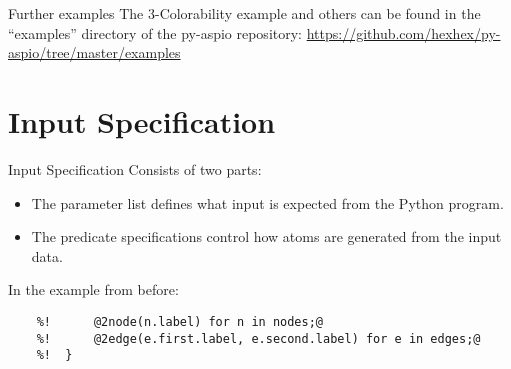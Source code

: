 \documentclass[%
beamer,%
english,%
10pt,%
]{beamer}
\newcommand{\blue}[1]{{\color{blue}#1}}
\newcommand{\orange}[1]{{\color{orange}#1}}
\begin{document}
\begin{frame}{Further examples}
    The 3-Colorability example and others can be found in the ``examples'' directory of the py-aspio repository:
    \url{https://github.com/hexhex/py-aspio/tree/master/examples}
\end{frame}



\section{Input Specification}

\begin{frame}[fragile]{Input Specification}
    Consists of two parts:
    \begin{itemize}
        \item
            The \blue{parameter list} defines what input is expected from the Python program.
        \item
            The \orange{predicate specifications} control how atoms are generated from the input data.
    \end{itemize}

    \bigskip

    In the example from before:
    \begin{lstlisting}[escapechar=`,basicstyle=\footnotesize,autogobble,moredelim={**[is][\color{blue}]{@1}{@}},moredelim={**[is][\color{orange}]{@2}{@}}]
    %!  INPUT (@1Set<Node> nodes, Set<Edge> edges@) {
    %!      @2node(n.label) for n in nodes;@
    %!      @2edge(e.first.label, e.second.label) for e in edges;@
    %!  }
    \end{lstlisting}
\end{frame}
\end{document}
